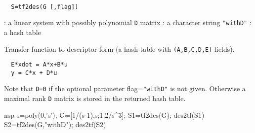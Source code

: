 \begin{mandesc}
   \\ %
\end{mandesc}
\begin{calling_sequence}
\begin{verbatim}
  S=tf2des(G [,flag])  
\end{verbatim}
\end{calling_sequence}
\begin{parameters}
  \begin{varlist}
    : a linear system with possibly polynomial \verb!D! matrix
    : a character string \verb!"withD"!
    : a hash table 
  \end{varlist}
\end{parameters}
\begin{mandescription}
  Transfer function to descriptor form (a hash table with \verb!(A,B,C,D,E)! fields).
\begin{verbatim}
  E*xdot = A*x+B*u
  y = C*x + D*u
\end{verbatim}
Note that \verb!D=0! if the optional parameter flag=\verb!"withD"! is not
given. Otherwise a maximal rank \verb!D! matrix is stored in the returned hash table.
\end{mandescription}
\begin{examples}
  \begin{mintednsp}{nsp}
    s=poly(0,'s');
    G=[1/(s-1),s;1,2/s^3];
    S1=tf2des(G);
    des2tf(S1)
    S2=tf2des(G,"withD");
    des2tf(S2)
  \end{mintednsp}
\end{examples}
\begin{manseealso}
       
\end{manseealso}
